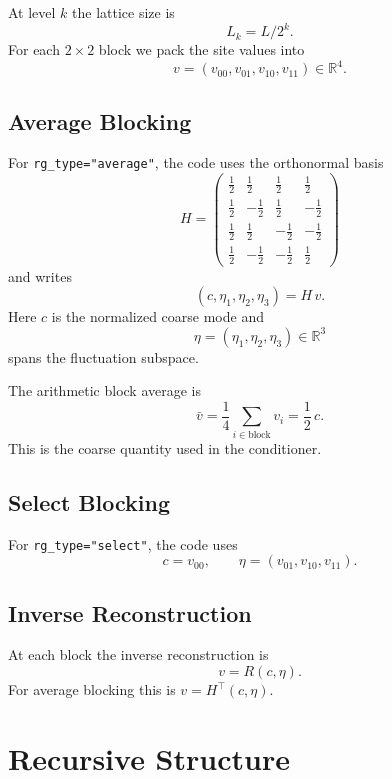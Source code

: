 \documentclass[11pt]{article}
\begin{document}
At level $k$ the lattice size is
\[
L_k = L/2^k.
\]
For each $2\times 2$ block we pack the site values into
\[
v=(v_{00},v_{01},v_{10},v_{11})\in\mathbb{R}^4.
\]

\subsection{Average Blocking}

For \texttt{rg\_type="average"}, the code uses the orthonormal basis
\begin{equation}
H=
\begin{pmatrix}
\tfrac12 & \tfrac12 & \tfrac12 & \tfrac12 \\
\tfrac12 & -\tfrac12 & \tfrac12 & -\tfrac12 \\
\tfrac12 & \tfrac12 & -\tfrac12 & -\tfrac12 \\
\tfrac12 & -\tfrac12 & -\tfrac12 & \tfrac12
\end{pmatrix}
\end{equation}
and writes
\begin{equation}
(c,\eta_1,\eta_2,\eta_3)=H\,v.
\end{equation}
Here $c$ is the normalized coarse mode and
\[
\eta=(\eta_1,\eta_2,\eta_3)\in\mathbb{R}^3
\]
spans the fluctuation subspace.

The arithmetic block average is
\[
\bar v = \frac14 \sum_{i\in \text{block}} v_i = \frac12\,c.
\]
This is the coarse quantity used in the conditioner.

\subsection{Select Blocking}

For \texttt{rg\_type="select"}, the code uses
\begin{equation}
c=v_{00},\qquad \eta=(v_{01},v_{10},v_{11}).
\end{equation}

\subsection{Inverse Reconstruction}

At each block the inverse reconstruction is
\[
v = R(c,\eta).
\]
For average blocking this is $v=H^\top(c,\eta)$.

\section{Recursive Structure}
\end{document}
